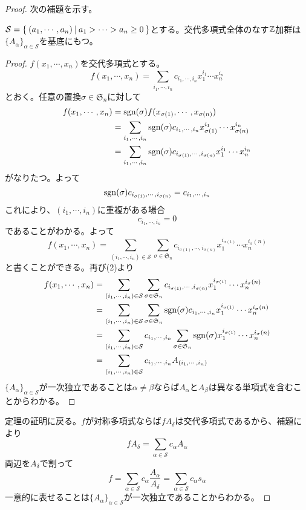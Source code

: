 \documentclass{ltjsreport}
\begin{document}
\begin{proof}
    次の補題を示す。
    \begin{lemm}
        $\mathcal{S}=\left\{\:(a_1,\cdots,a_n)\:\middle|\:a_1>\cdots>a_n\geq 0\:\right\}$とする。交代多項式全体のなす$\mathbb{Z}$加群は$\{A_\alpha\}_{\alpha\in\mathcal{S}}$を基底にもつ。
    \end{lemm}
    \begin{proof}
        $f(x_1,\cdots,x_n)$を交代多項式とする。
        \[
        f(x_1,\cdots,x_n)=\sum_{i_1,\cdots,i_n}c_{i_1,\cdots,i_n}x_1^{i_1}\cdots x_n^{i_n}    
        \]
        とおく。任意の置換$\sigma\in\mathfrak{S}_n$に対して
        \begin{align*}
            f(x_1,\cdots,x_n)&=\mathrm{sgn}(\sigma)f(x_{\sigma(1)},\cdots,x_{\sigma(n)})\\
            &=\sum_{i_1,\cdots,i_n}\mathrm{sgn}(\sigma)c_{i_1,\cdots,i_n}x_{\sigma(1)}^{i_1}\cdots x_{\sigma(n)}^{i_n}\\
            &=\sum_{i_1,\cdots,i_n}\mathrm{sgn}(\sigma)c_{i_{\sigma(1)},\cdots,i_{\sigma(n)}}x_1^{i_1}\cdots x_n^{i_n}
        \end{align*}
        がなりたつ。よって
        \begin{equation}
            \mathrm{sgn}(\sigma)c_{i_{\sigma(1)},\cdots,i_{\sigma(n)}}=c_{i_1,\cdots,i_n}
        \end{equation}
        これにより、$(i_1,\cdots,i_n)$に重複がある場合
        \[
        c_{i_1,\cdots,i_n}=0
        \]
        であることがわかる。よって
        \[
        f(x_1,\cdots,x_n)=\sum_{(i_1,\cdots,i_n)\in\mathcal{S}}\sum_{\sigma\in\mathfrak{S}_n}c_{i_{\sigma(1)},\cdots,i_{\sigma(n)}}x_1^{i_{\sigma(1)}}\cdots x_n^{i_\sigma(n)}    
        \]
        と書くことができる。再び(2)より
        \begin{align*}
        f(x_1,\cdots,x_n)
        &=\sum_{(i_1,\cdots,i_n)\in\mathcal{S}}\sum_{\sigma\in\mathfrak{S}_n}c_{i_{\sigma(1)},\cdots,i_{\sigma(n)}}x_1^{i_{\sigma(1)}}\cdots x_n^{i_\sigma(n)}\\
        &=\sum_{(i_1,\cdots,i_n)\in\mathcal{S}}\sum_{\sigma\in\mathfrak{S}_n}\mathrm{sgn}(\sigma)c_{i_1,\cdots,i_n}x_1^{i_{\sigma(1)}}\cdots x_n^{i_\sigma(n)}\\
        &=\sum_{(i_1,\cdots,i_n)\in\mathcal{S}}c_{i_1,\cdots,i_n}\sum_{\sigma\in\mathfrak{S}_n}\mathrm{sgn}(\sigma)x_1^{i_{\sigma(1)}}\cdots x_n^{i_\sigma(n)}\\
        &=\sum_{(i_1,\cdots,i_n)\in\mathcal{S}}c_{i_1,\cdots,i_n}A_{(i_1,\cdots,i_n)}
        \end{align*}
        $\{A_\alpha\}_{\alpha\in\mathcal{S}}$が一次独立であることは$\alpha\neq\beta$ならば$A_\alpha$と$A_\beta$は異なる単項式を含むことからわかる。
    \end{proof}

    定理の証明に戻る。$f$が対称多項式ならば$fA_\delta$は交代多項式であるから、補題により
    \[
    fA_\delta=\sum_{\alpha\in\mathcal{S}}c_\alpha A_\alpha    
    \]
    両辺を$A_\delta$で割って
    \[
    f=\sum_{\alpha\in\mathcal{S}}c_{\alpha}\frac{A_\alpha}{A_\delta}=\sum_{\alpha\in\mathcal{S}}c_{\alpha}s_\alpha    
    \]
    一意的に表せることは$\{A_\alpha\}_{\alpha\in\mathcal{S}}$が一次独立であることからわかる。
\end{proof}
\end{document}
